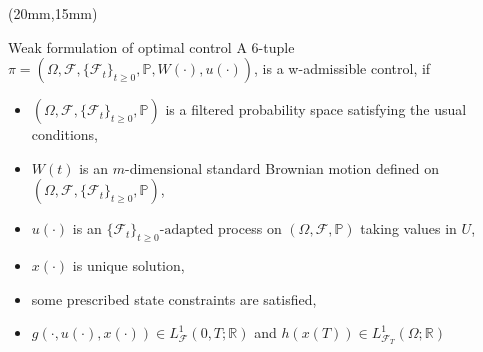 \begin{frame}[plain]
    \begin{textblock*}{90mm}(20mm,15mm)
        \begin{graybox}{Weak formulation of optimal control}
             A 6-tuple 
             $
                \pi=(
                    \Omega,
                    \mathcal{F},
                    \{\mathcal{F}_t\}_{t\geq 0},
                    \mathbb{P},
                    W(\cdot),
                    u(\cdot)
                )
            $, 
            is  a {w-admissible} control, if
        \begin{itemize}[<+->]
            \item 
                $
                    (
                        \Omega,
                        \mathcal{F},
                        \{\mathcal{F}_t\}_{t\geq 0},
                        \mathbb{P}
                    )
                $ is a filtered probability space satisfying the usual
                conditions,
            \item 
                $W(t)$ 
                is an $m$-dimensional standard Brownian motion 
                defined on 
                $
                    (
                        \Omega,
                        \mathcal{F},
                        \{\mathcal{F}_t\}_{t\geq 0},\mathbb{P}
                    )
                $,
            \item 
                $u(\cdot)$ is an 
                $
                    \{
                        \mathcal{F}_t\}_{t \geq 0}
                        \text{-adapted}
                $ 
                process on $(\Omega,\mathcal{F},\mathbb{P})$ taking values 
                in $U$,
            \item 
                $x(\cdot)$ is unique solution,
            \item 
                some prescribed state constraints are satisfied,
            \item 
                $
                    g(\cdot, u(\cdot), x(\cdot))
                    \in 
                    L^1_{
                        \mathcal{F}
                    }
                    (
                        0, T; \mathbb{R}
                )
                $ and 
                $
                    h(x(T))
                    \in 
                    L^1_{\mathcal{F}_T}
                    (\Omega;\mathbb{R})
                $
            \end{itemize}
       \end{graybox}
    \end{textblock*}
\end{frame}

